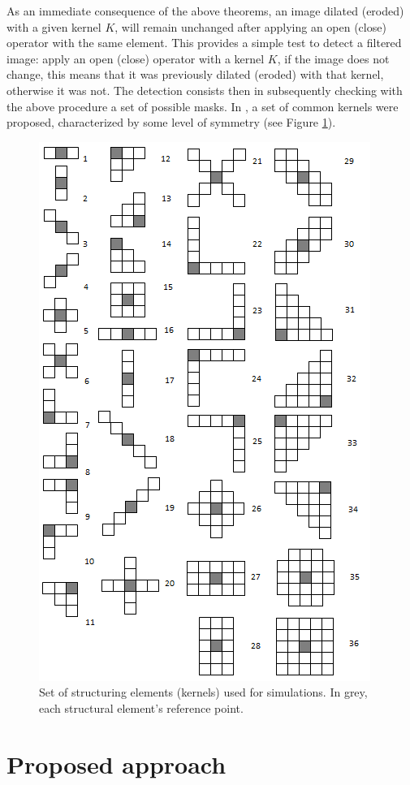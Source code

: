 \documentclass[review]{elsarticle}
\begin{document}
As an immediate consequence of the above theorems, an image dilated (eroded) with a given kernel $K$, will remain unchanged after applying an open (close) operator with the same element. This provides a simple test to detect a filtered image: apply an open (close) operator with a kernel $K$, if the image does not change, this means that it was previously dilated (eroded) with that kernel, otherwise it was not. The detection consists then in subsequently checking with the above procedure a set of possible masks. In \cite{de2017detecting}, a set of common kernels were proposed, characterized by some level of symmetry (see Figure \ref{fig:masks}).

\begin{figure}[!ht]
	\centering
	\includegraphics[width=0.7\linewidth]{masks.png}
	\caption{Set of structuring elements (kernels) used for simulations. In grey, each structural element's reference point.}
	\label{fig:masks}
\end{figure}

\section{Proposed approach}
\label{sec:method}
\end{document}
